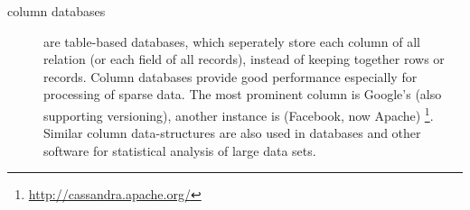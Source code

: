\begin{description}
\item[column databases] are table-based databases, which seperately store 
each column of all relation (or each field of all records), instead of
keeping together rows or records. Column databases provide good performance
especially for processing of sparse data. The most prominent column 
 is Google's  \cite{Chang2006} (also supporting
versioning), another instance is  (Facebook, now Apache)%
\footnote{\url{http://cassandra.apache.org/}}. Similar column data-structures
are also used in databases and other software for statistical analysis of
large data sets.

\end{description}

